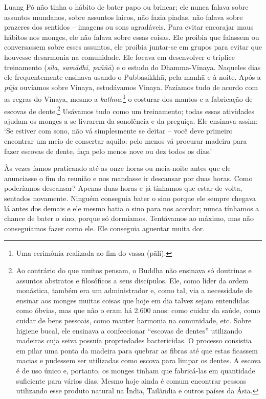 Luang Pó não tinha o hábito de bater papo ou brincar; ele nunca falava
sobre assuntos mundanos, sobre assuntos laicos, não fazia piadas, não
falava sobre prazeres dos sentidos -- imagens ou sons agradáveis. Para
evitar encorajar maus hábitos nos monges, ele não falava sobre essas
coisas. Ele proibia que falassem ou conversassem sobre esses assuntos,
ele proibia juntar-se em grupos para evitar que houvesse desarmonia na
comunidade. Ele focava em desenvolver o tríplice treinamento
(\emph{sīla, samādhi, paññā}) e o estudo do Dhamma-Vinaya. Naqueles dias
ele frequentemente ensinava usando o Pubbasikkhā, pela manhã e à noite.
Após a \emph{pūja} ouvíamos sobre Vinaya, estudávamos Vinaya. Fazíamos
tudo de acordo com as regras do Vinaya, mesmo a \emph{kathna},\footnote{Uma
  cerimônia realizada ao fim do vassa (pāli).} o costurar dos
mantos e a fabricação de escovas de dente.\footnote{Ao contrário do que
  muitos pensam, o Buddha não ensinava só doutrinas e assuntos abstratos
  e filosóficos a seus discípulos. Ele, como líder da ordem monástica,
  também era um administrador e, como tal, via a necessidade de ensinar
  aos monges muitas coisas que hoje em dia talvez sejam entendidas como
  óbvias, mas que não o eram há 2.600 anos: como cuidar da saúde, como
  cuidar de bens pessoais, como manter harmonia na comunidade, etc.
  Sobre higiene bucal, ele ensinava a confeccionar ``escovas de dentes''
  utilizando madeiras cuja seiva possuía propriedades bactericidas. O
  processo consistia em pilar uma ponta da madeira para quebrar as
  fibras até que estas ficassem macias e pudessem ser utilizadas como
  escova para limpar os dentes. A escova é de uso único e, portanto, os
  monges tinham que fabricá-las em quantidade suficiente para vários
  dias. Mesmo hoje ainda é comum encontrar pessoas utilizando esse
  produto natural na Índia, Tailândia e outros países da Ásia.}
Usávamos tudo como um treinamento; todas essas atividades ajudam os
monges a se livrarem da sonolência e da preguiça. Ele ensinava assim:
`Se estiver com sono, não vá simplesmente se deitar -- você deve
primeiro encontrar um meio de consertar aquilo: pelo menos vá procurar
madeira para fazer escovas de dente, faça pelo menos nove ou dez todos
os dias.'

Às vezes íamos praticando até as onze horas ou meia-noite antes que ele
anunciasse o fim da reunião e nos mandasse ir descansar por duas horas.
Como poderíamos descansar? Apenas duas horas e já tínhamos que estar de
volta, sentados novamente. Ninguém \mbox{conseguia} bater o sino porque ele
sempre chegava lá antes dos demais e ele mesmo batia o sino para nos
acordar; nunca tínhamos a chance de bater o sino, porque só dormíamos.
Tentávamos ao máximo, mas não conseguíamos fazer como ele. Ele conseguia
aguentar muita dor.

